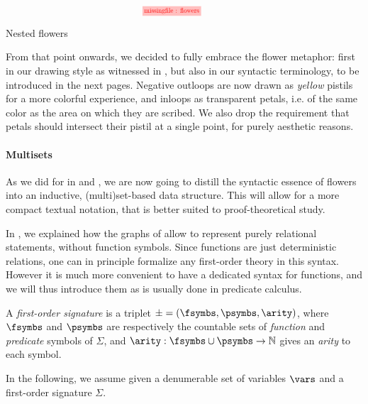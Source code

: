 \begin{marginfigure}
  $$
  \!\!\!\!
  \!\!\!\!
  \!\!\!\!
  \!\!\!\!
  \stkfig{0.65}{flowers}
  $$
  \vspace{-3em}
  \caption{Nested flowers}
\end{marginfigure}

From that point onwards, we decided to fully embrace the flower metaphor: first
in our drawing style as witnessed in , but also in our syntactic
terminology, to be introduced in the next pages. Negative outloops are now drawn
as \emph{yellow} pistils for a more colorful experience, and inloops as
transparent petals, i.e. of the same color as the area on which they are
scribed. We also drop the requirement that petals should intersect their pistil
at a single point, for purely aesthetic reasons.

\paragraph{Multisets}

As we did for   in  and , we are
now going to distill the syntactic essence of flowers into an inductive,
(multi)set-based data structure. This will allow for a more compact textual
notation, that is better suited to proof-theoretical study.

In , we explained how the graphs of  allow to represent
purely relational statements, without function symbols. Since functions are just
deterministic relations, one can in principle formalize any first-order theory
in this syntax. However it is much more convenient to
have a dedicated syntax for functions, and we will thus introduce them as is
usually done in predicate calculus.

\begin{definition}
  A \emph{first-order signature} is a triplet $\mathcal{\Sigma} = (
  \fsymbs, \psymbs, \arity )$, where $\fsymbs$ and $\psymbs$ are
  respectively the countable sets of \emph{function} and \emph{predicate}
  symbols of $\Sigma$, and $\arity : \fsymbs \cup \psymbs \to \nats$ gives an
  \emph{arity} to each symbol.
\end{definition}

In the following, we assume given a denumerable set of variables $\vars$
and a first-order signature $\Sigma$.

